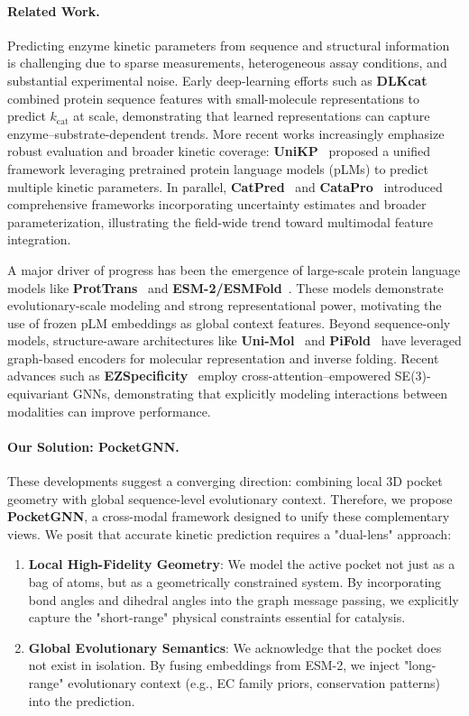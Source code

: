 \documentclass[11pt]{article}
\begin{document}
\paragraph{Related Work.}
Predicting enzyme kinetic parameters from sequence and structural information is challenging due to sparse measurements, heterogeneous assay conditions, and substantial experimental noise. Early deep-learning efforts such as \textbf{DLKcat}~\citep{dlkcat} combined protein sequence features with small-molecule representations to predict $k_{\text{cat}}$ at scale, demonstrating that learned representations can capture enzyme–substrate-dependent trends. More recent works increasingly emphasize robust evaluation and broader kinetic coverage: \textbf{UniKP}~\citep{yu2023unikp} proposed a unified framework leveraging pretrained protein language models (pLMs) to predict multiple kinetic parameters. In parallel, \textbf{CatPred}~\citep{catpred} and \textbf{CataPro}~\citep{catapro} introduced comprehensive frameworks incorporating uncertainty estimates and broader parameterization, illustrating the field-wide trend toward multimodal feature integration.

A major driver of progress has been the emergence of large-scale protein language models like \textbf{ProtTrans}~\citep{prottrans} and \textbf{ESM-2/ESMFold}~\citep{esmfold}. These models demonstrate evolutionary-scale modeling and strong representational power, motivating the use of frozen pLM embeddings as global context features. Beyond sequence-only models, structure-aware architectures like \textbf{Uni-Mol}~\citep{unimol} and \textbf{PiFold}~\citep{pifold} have leveraged graph-based encoders for molecular representation and inverse folding. Recent advances such as \textbf{EZSpecificity}~\citep{ezspecificity} employ cross-attention--empowered SE(3)-equivariant GNNs, demonstrating that explicitly modeling interactions between modalities can improve performance.

\paragraph{Our Solution: PocketGNN.}
These developments suggest a converging direction: combining local 3D pocket geometry with global sequence-level evolutionary context. Therefore, we propose \textbf{PocketGNN}, a cross-modal framework designed to unify these complementary views. We posit that accurate kinetic prediction requires a "dual-lens" approach:
\begin{enumerate}
    \item \textbf{Local High-Fidelity Geometry}: We model the active pocket not just as a bag of atoms, but as a geometrically constrained system. By incorporating bond angles and dihedral angles into the graph message passing, we explicitly capture the "short-range" physical constraints essential for catalysis.
    \item \textbf{Global Evolutionary Semantics}: We acknowledge that the pocket does not exist in isolation. By fusing embeddings from ESM-2, we inject "long-range" evolutionary context (e.g., EC family priors, conservation patterns) into the prediction.
\end{enumerate}
\end{document}
